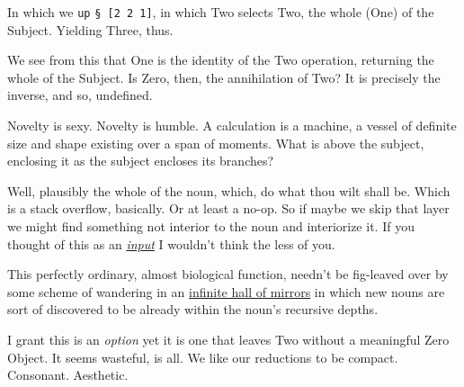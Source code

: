\documentclass[twoside]{article}
\begin{document}
In which we \texttt{up} \lstinline[style=inlinecode]{§ [2 2 1]}, in which Two selects Two, the whole (One) of the Subject. Yielding Three, thus.

We see from this that One is the identity of the Two operation, returning the whole of the Subject. Is Zero, then, the annihilation of Two? It is precisely the inverse, and so, undefined.

Novelty is sexy. Novelty is humble. A calculation is a machine, a vessel of definite size and shape existing over a span of moments. What is above the subject, enclosing it as the subject encloses its branches?

Well, plausibly the whole of the noun, which, do what thou wilt shall be. Which is a stack overflow, basically. Or at least a no-op. So if maybe we skip that layer we might find something not interior to the noun and interiorize it. If you thought of this as an \href{https://en.wikipedia.org/wiki/Pseudopodia}{\emph{input}} I wouldn't think the less of you.

This perfectly ordinary, almost biological function, needn't be fig-leaved over by some scheme of wandering in an \href{https://en.wikipedia.org/wiki/The_Library_of_Babel}{infinite hall of mirrors} in which new nouns are sort of discovered to be already within the noun's recursive depths.

I grant this is an \emph{option} yet it is one that leaves Two without a meaningful Zero Object. It seems wasteful, is all.  We like our reductions to be compact. Consonant. Aesthetic.


\end{document}
